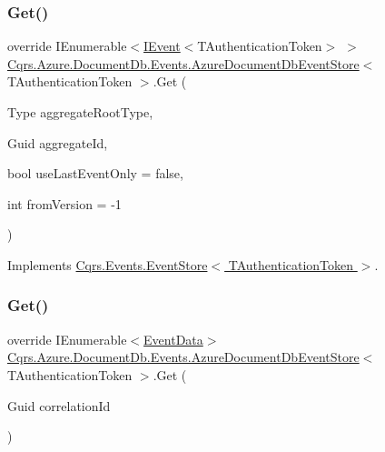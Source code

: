\subsubsection{\texorpdfstring{Get()}{Get()}\hspace{0.1cm}{\footnotesize\ttfamily [1/2]}}
{\footnotesize\ttfamily override I\+Enumerable$<$\hyperlink{interfaceCqrs_1_1Events_1_1IEvent}{I\+Event}$<$T\+Authentication\+Token$>$ $>$ \hyperlink{classCqrs_1_1Azure_1_1DocumentDb_1_1Events_1_1AzureDocumentDbEventStore}{Cqrs.\+Azure.\+Document\+Db.\+Events.\+Azure\+Document\+Db\+Event\+Store}$<$ T\+Authentication\+Token $>$.Get (\begin{DoxyParamCaption}\item[{Type}]{aggregate\+Root\+Type,  }\item[{Guid}]{aggregate\+Id,  }\item[{bool}]{use\+Last\+Event\+Only = {\ttfamily false},  }\item[{int}]{from\+Version = {\ttfamily -\/1} }\end{DoxyParamCaption})\hspace{0.3cm}{\ttfamily [virtual]}}



Implements \hyperlink{classCqrs_1_1Events_1_1EventStore_aa1d0d399a35c1e3b0759e27202695d8b}{Cqrs.\+Events.\+Event\+Store$<$ T\+Authentication\+Token $>$}.

\mbox{\label{classCqrs_1_1Azure_1_1DocumentDb_1_1Events_1_1AzureDocumentDbEventStore_ac59ce599b768ce047869b8ac135f4e22}} 
\subsubsection{\texorpdfstring{Get()}{Get()}\hspace{0.1cm}{\footnotesize\ttfamily [2/2]}}
{\footnotesize\ttfamily override I\+Enumerable$<$\hyperlink{classCqrs_1_1Events_1_1EventData}{Event\+Data}$>$ \hyperlink{classCqrs_1_1Azure_1_1DocumentDb_1_1Events_1_1AzureDocumentDbEventStore}{Cqrs.\+Azure.\+Document\+Db.\+Events.\+Azure\+Document\+Db\+Event\+Store}$<$ T\+Authentication\+Token $>$.Get (\begin{DoxyParamCaption}\item[{Guid}]{correlation\+Id }\end{DoxyParamCaption})\hspace{0.3cm}{\ttfamily [virtual]}}



